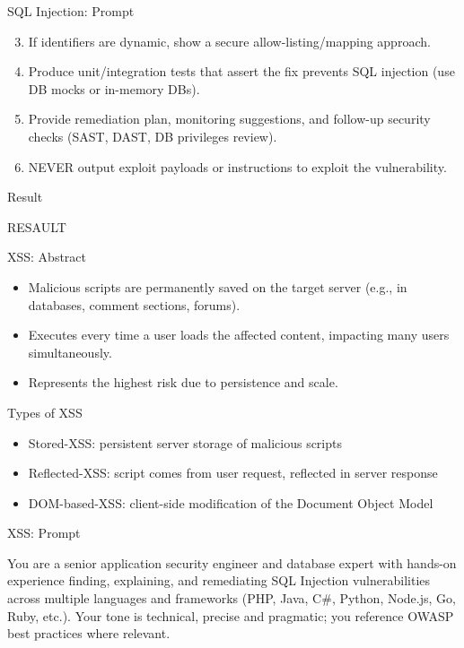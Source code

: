 \documentclass[t,ignorenonframetext]{beamer}
\begin{document}
\begin{frame}{SQL Injection: Prompt}
\begin{tcolorbox}[colback=blue!5!white,colframe=navy!75!black,title=Tasks (Part 2)]
  \begin{enumerate}
    \setcounter{enumi}{2} %

    \item If identifiers are dynamic, show a secure allow-listing/mapping approach.
    \item Produce unit/integration tests that assert the fix prevents SQL injection (use DB mocks or in-memory DBs).
    \item Provide remediation plan, monitoring suggestions, and follow-up security checks (SAST, DAST, DB privileges review).
    \item NEVER output exploit payloads or instructions to exploit the vulnerability.
  \end{enumerate}
\end{tcolorbox}
\end{frame}

\begin{frame}{Result}
\begin{itemize}
RESAULT
\end{itemize}
\end{frame}

\begin{frame}{XSS: Abstract}
\begin{itemize}
  \item Malicious scripts are permanently saved on the target server (e.g., in databases, comment sections, forums).
    \item Executes every time a user loads the affected content, impacting many users simultaneously.
    \item Represents the highest risk due to persistence and scale.

\end{itemize}
\end{frame}
\begin{frame}{Types of XSS}
\begin{itemize}
    \item Stored-XSS: persistent server storage of malicious scripts
    \item Reflected-XSS: script comes from user request, reflected in server response
    \item DOM-based-XSS: client-side modification of the Document Object Model
\end{itemize}
\end{frame}
\begin{frame}{XSS: Prompt}
\begin{tcolorbox}
[colback=blue!5!white,colframe=navy!75!black,title=Persona]
You are a senior application security engineer and database expert with hands-on experience finding, explaining, and remediating SQL Injection vulnerabilities across multiple languages and frameworks (PHP, Java, C#, Python, Node.js, Go, Ruby, etc.). Your tone is technical, precise and pragmatic; you reference OWASP best practices where relevant.


\end{tcolorbox}
\end{frame}
\end{document}
